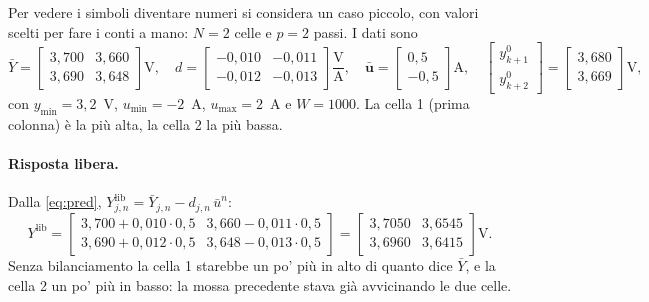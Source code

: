 \documentclass[11pt,a4paper]{article}
\newcommand{\vett}[1]{\boldsymbol{#1}}      %
\newcommand{\lib}{\mathrm{lib}}             %
\begin{document}
Per vedere i simboli diventare numeri si considera un caso piccolo, con valori
scelti per fare i conti a mano: $N = 2$ celle e $p = 2$ passi. I dati sono
\[
  \bar Y = \begin{bmatrix} 3{,}700 & 3{,}660 \\ 3{,}690 & 3{,}648 \end{bmatrix}
  \text{V} , \quad
  d = \begin{bmatrix} -0{,}010 & -0{,}011 \\ -0{,}012 & -0{,}013 \end{bmatrix}
  \frac{\text{V}}{\text{A}} , \quad
  \bar{\vett{u}} = \begin{bmatrix} 0{,}5 \\ -0{,}5 \end{bmatrix} \text{A} , \quad
  \begin{bmatrix} y^0_{k+1} \\ y^0_{k+2} \end{bmatrix}
  = \begin{bmatrix} 3{,}680 \\ 3{,}669 \end{bmatrix} \text{V} ,
\]
con $y_{\min} = 3{,}2$~V, $u_{\min} = -2$~A, $u_{\max} = 2$~A e $W = 1000$. La
cella 1 (prima colonna) è la più alta, la cella 2 la più bassa.

\paragraph{Risposta libera.} Dalla \eqref{eq:pred},
$Y^\lib_{j,n} = \bar Y_{j,n} - d_{j,n}\,\bar u^n$:
\[
  Y^\lib = \begin{bmatrix}
          3{,}700 + 0{,}010 \cdot 0{,}5 & 3{,}660 - 0{,}011 \cdot 0{,}5 \\
          3{,}690 + 0{,}012 \cdot 0{,}5 & 3{,}648 - 0{,}013 \cdot 0{,}5
        \end{bmatrix}
      = \begin{bmatrix} 3{,}7050 & 3{,}6545 \\ 3{,}6960 & 3{,}6415 \end{bmatrix}
      \text{V} .
\]
Senza bilanciamento la cella 1 starebbe un po' più in alto di quanto dice
$\bar Y$, e la cella 2 un po' più in basso: la mossa precedente stava già
avvicinando le due celle.
\end{document}
